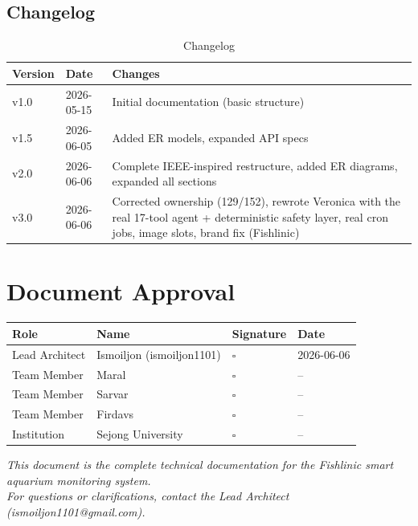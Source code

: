 \documentclass[12pt,a4paper,oneside]{article}
\begin{document}
\subsection{Changelog}
\begin{table}[H]
    \centering\small
    \begin{tabularx}{\textwidth}{llX}
        \toprule
        \textbf{Version} & \textbf{Date} & \textbf{Changes} \\
        \midrule
        v1.0 & 2026-05-15 & Initial documentation (basic structure) \\
        v1.5 & 2026-06-05 & Added ER models, expanded API specs \\
        v2.0 & 2026-06-06 & Complete IEEE-inspired restructure, added ER diagrams, expanded all sections \\
        v3.0 & 2026-06-06 & Corrected ownership (129/152), rewrote Veronica with the real 17-tool agent + deterministic safety layer, real cron jobs, image slots, brand fix (Fishlinic) \\
        \bottomrule
    \end{tabularx}
    \caption{Changelog}
\end{table}

\newpage
\section*{Document Approval}

\begin{table}[H]
    \centering\small
    \begin{tabularx}{\textwidth}{lYll}
        \toprule
        \textbf{Role} & \textbf{Name} & \textbf{Signature} & \textbf{Date} \\
        \midrule
        Lead Architect & Ismoiljon (ismoiljon1101) & $\square$ & 2026-06-06 \\
        Team Member & Maral & $\square$ & -- \\
        Team Member & Sarvar & $\square$ & -- \\
        Team Member & Firdavs & $\square$ & -- \\
        Institution & Sejong University & $\square$ & -- \\
        \bottomrule
    \end{tabularx}
\end{table}

\vfill
\begin{center}
    \textit{This document is the complete technical documentation for the Fishlinic smart aquarium monitoring system.}\\
    \textit{For questions or clarifications, contact the Lead Architect (ismoiljon1101@gmail.com).}
\end{center}
\end{document}

